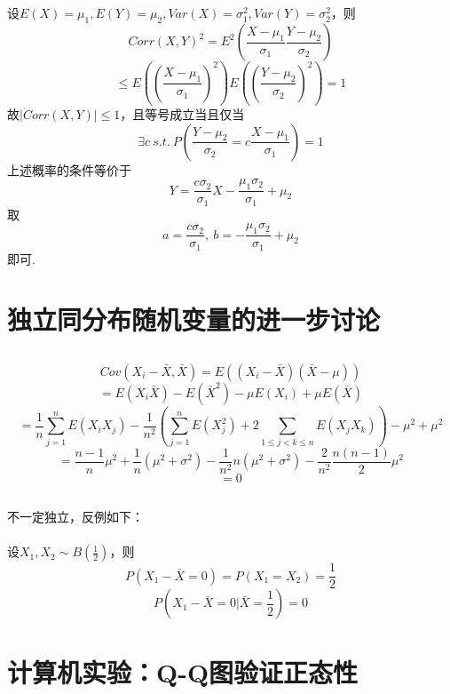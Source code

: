 \documentclass{article}
\begin{document}
\begin{CJK}{UTF8}{gbsn}
\subsection{}
设$E(X)=\mu_{1},E(Y)=\mu_{2},Var(X)=\sigma_{1}^{2},Var(Y)=\sigma_{2}^{2}$，则
$$ Corr(X,Y)^{2}=E^{2}(\frac{X-\mu_{1}}{\sigma_{1}}\frac{Y-\mu_{2}}{\sigma_{2}})$$
$$ \leq E((\frac{X-\mu_{1}}{\sigma_{1}})^{2})E((\frac{Y-\mu_{2}}{\sigma_{2}})^{2})=1$$
故$|Corr(X,Y)|\leq 1$，且等号成立当且仅当
$$\exists c\ s.t.\ P(\frac{Y-\mu_{2}}{\sigma_{2}}=c\frac{X-\mu_{1}}{\sigma_{1}})=1$$
上述概率的条件等价于
$$ Y=\frac{c\sigma_{2}}{\sigma_{1}}X-\frac{\mu_{1}\sigma_{2}}{\sigma_{1}}+\mu_{2}$$
取
$$ a=\frac{c\sigma_{2}}{\sigma_{1}},\ b=-\frac{\mu_{1}\sigma_{2}}{\sigma_{1}}+\mu_{2}$$
即可.
\section{独立同分布随机变量的进一步讨论}
\subsection{}
$$ Cov(X_{i}-\bar{X},\bar{X})=E((X_{i}-\bar{X})(\bar{X}-\mu))$$
$$ =E(X_{i}\bar{X})-E(\bar{X}^{2})-\mu E(X_{i})+\mu E(\bar{X})$$
$$ =\frac{1}{n}\sum\limits_{j=1}^{n}E(X_{i}X_{j})-\frac{1}{n^{2}}(\sum\limits_{j=1}^{n}E(X_{j}^{2})+2\sum\limits_{1\leq j<k\leq n}E(X_{j}X_{k}))-\mu^{2}+\mu^{2}$$
$$ =\frac{n-1}{n}\mu^{2}+\frac{1}{n}(\mu^{2}+\sigma^{2})-\frac{1}{n^{2}}n(\mu^{2}+\sigma^{2})-\frac{2}{n^{2}}\frac{n(n-1)}{2}\mu^{2}$$
$$ =0$$
\subsection{}
不一定独立，反例如下：
\\\\设$X_{1},X_{2}\sim B(\frac{1}{2})$，则
$$ P(X_{1}-\bar{X}=0)=P(X_{1}=X_{2})=\frac{1}{2}$$
$$ P(X_{1}-\bar{X}=0|\bar{X}=\frac{1}{2})=0$$
\section{计算机实验：Q-Q图验证正态性}

\end{CJK}
\end{document}
